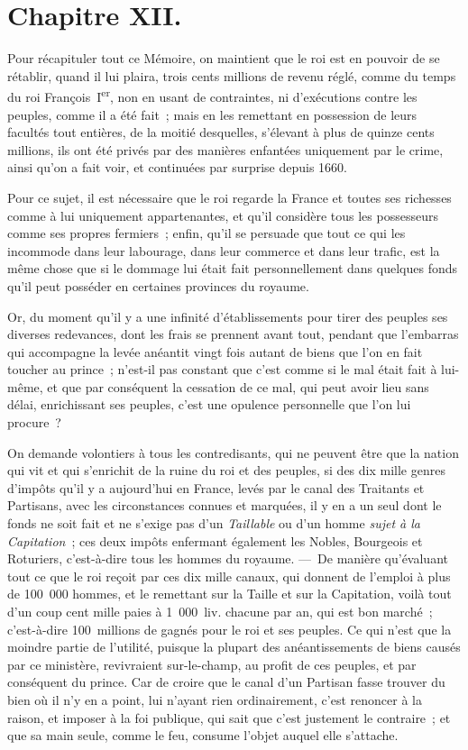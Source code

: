 \documentclass[french,twoside]{book} %
\begin{document}
\section[{Chapitre XII.}]{Chapitre XII.}
\noindent Pour récapituler tout ce Mémoire, on maintient que le roi est en pouvoir de se rétablir, quand il lui plaira, trois cents millions de revenu réglé, comme du temps du roi François I\textsuperscript{er}, non en usant de contraintes, ni d’exécutions contre les peuples, comme il a été fait ; mais en les remettant en possession de leurs facultés tout entières, de la moitié desquelles, s’élevant à plus de quinze cents millions, ils ont été privés par des manières enfantées uniquement par le crime, ainsi qu’on a fait voir, et continuées par surprise depuis 1660.\par
Pour ce sujet, il est nécessaire que le roi regarde la France et toutes ses richesses comme à lui uniquement appartenantes, et qu’il considère tous les possesseurs comme ses propres fermiers ; enfin, qu’il se persuade que tout ce qui les incommode dans leur labourage, dans leur commerce et dans leur trafic, est la même chose que si le dommage lui était fait personnellement dans quelques fonds qu’il peut posséder en certaines provinces du royaume.\par
Or, du moment qu’il y a une infinité d’établissements pour tirer des peuples ses diverses redevances, dont les frais se prennent avant tout, pendant que l’embarras qui accompagne la levée anéantit vingt fois autant de biens que l’on en fait toucher au prince ; n’est-il pas constant que c’est comme si le mal était fait à lui-même, et que par conséquent la cessation de ce mal, qui peut avoir lieu sans délai, enrichissant ses peuples, c’est une opulence personnelle que l’on lui procure ?\par
On demande volontiers à tous les contredisants, qui ne peuvent être que la nation qui vit et qui s’enrichit de la ruine du roi et des peuples, si des dix mille genres d’impôts qu’il y a aujourd’hui en France, levés par le canal des Traitants et Partisans, avec les circonstances connues et marquées, il y en a un seul dont le fonds ne soit fait et ne s’exige pas d’un {\itshape Taillable} ou d’un homme {\itshape sujet à la Capitation} ; ces deux impôts enfermant également les Nobles, Bourgeois et Roturiers, c’est-à-dire tous les hommes du royaume. — De manière qu’évaluant tout ce que le roi reçoit par ces dix mille canaux, qui donnent de l’emploi à plus de 100 000 hommes, et le remettant sur la Taille et sur la Capitation, voilà tout d’un coup cent mille paies à 1 000 liv. chacune par an, qui est bon marché ; c’est-à-dire 100 millions de gagnés pour le roi et ses peuples. Ce qui n’est que la moindre partie de l’utilité, puisque la plupart des anéantissements de biens causés par ce ministère, revivraient sur-le-champ, au profit de ces peuples, et par conséquent du prince. Car de croire que le canal d’un Partisan fasse trouver du bien où il n’y en a point, lui n’ayant rien ordinairement, c’est renoncer à la raison, et imposer à la foi publique, qui sait que c’est justement le contraire ; et que sa main seule, comme le feu, consume l’objet auquel elle s’attache.\par
\end{document}
